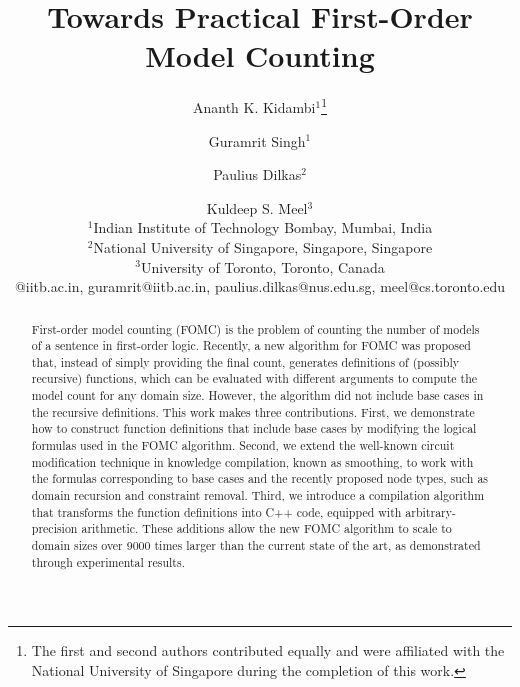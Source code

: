 \documentclass{article}
\title{Towards Practical First-Order Model Counting}
\author{%
  Ananth K. Kidambi$^1$\footnote{The first and second authors contributed equally and were affiliated with the National University of Singapore during the completion of this work.}\and
Guramrit Singh$^1$\and
Paulius Dilkas$^2$\and
Kuldeep S. Meel$^3$ \\
\affiliations
$^1$Indian Institute of Technology Bombay, Mumbai, India\\
$^2$National University of Singapore, Singapore, Singapore\\
$^3$University of Toronto, Toronto, Canada\\
\emails
210051002@iitb.ac.in,
guramrit@iitb.ac.in,
paulius.dilkas@nus.edu.sg,
meel@cs.toronto.edu
}%
\theoremstyle{remark}
\begin{document}
\maketitle

\begin{abstract}
  First-order model counting (FOMC) is the problem of counting the number of
  models of a sentence in first-order logic. Recently, a new algorithm for FOMC
  was proposed that, instead of simply providing the final count, generates
  definitions of (possibly recursive) functions, which can be evaluated with
  different arguments to compute the model count for any domain size. However,
  the algorithm did not include base cases in the recursive definitions. This
  work makes three contributions. First, we demonstrate how to construct
  function definitions that include base cases by modifying the logical formulas
  used in the FOMC algorithm. Second, we extend the well-known circuit
  modification technique in knowledge compilation, known as smoothing, to work
  with the formulas corresponding to base cases and the recently proposed node
  types, such as domain recursion and constraint removal. Third, we introduce a
  compilation algorithm that transforms the function definitions into C++ code,
  equipped with arbitrary-precision arithmetic. These additions allow the new
  FOMC algorithm to scale to domain sizes over \num{9000} times larger than the
  current state of the art, as demonstrated through experimental results.
\end{abstract}




\end{document}
